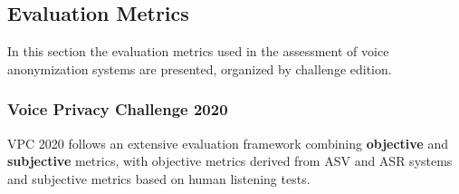 \documentclass[12pt,leqno,a4paper]{article}
\begin{document}

\subsection{Evaluation Metrics}
In this section the evaluation metrics used in the assessment of voice 
anonymization systems are presented, organized by challenge edition.

\subsubsection{Voice Privacy Challenge 2020} \label{subsec:vpc2020}
VPC 2020 \citep{tomashenko_introducing_2020, tomashenko_voiceprivacy_2022-1, 
tomashenko_voiceprivacy_nodate} follows an extensive evaluation framework 
combining \textbf{objective} and \textbf{subjective} metrics, with 
objective metrics derived from ASV and ASR systems and subjective metrics 
based on human listening tests.
\end{document}
